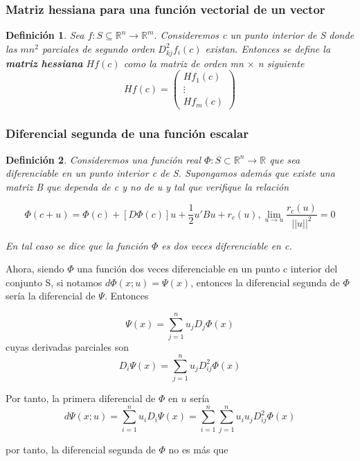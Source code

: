 \documentclass{article}
\theoremstyle{theorem-style}  %
\theoremstyle{definition-style}
\newtheorem{definition}{Definición}[section]
\theoremstyle{example-style}
\theoremstyle{exercise-style}
\begin{document}
	\subsubsection{Matriz hessiana para una función vectorial de un vector}
	
	\begin{definition}
		Sea $f: S \subseteq \mathbb{R}^n \rightarrow \mathbb{R}^m.$ Consideremos c un punto interior de S donde las $mn^2$ parciales de segundo orden $D^2_{kj}f_i(c)$ existan. Entonces se define la \textbf{matriz hessiana} $Hf(c)$ como la matriz de orden mn $\times$ n siguiente
		$$Hf(c) = \left( \begin{matrix}
		Hf_1(c) \\
		\vdots \\
		Hf_m(c) \end{matrix} \right)$$
	\end{definition}
	
	\subsubsection{Diferencial segunda de una función escalar}
	
	\begin{definition}
		Consideremos una función real $\Phi: S \subset \mathbb{R}^n \rightarrow \mathbb{R}$ que sea diferenciable en un punto interior c de S. Supongamos además que existe una matriz B que dependa de c y no de u y tal que verifique la relación
		
		$$\Phi(c + u) = \Phi(c) + [D \Phi(c)]u + \frac{1}{2} u' Bu + r_c(u), \lim_{u \rightarrow u} \frac{r_c(u)}{||u||^2} = 0$$
		
		En tal caso se dice que la función $\Phi$ es dos veces diferenciable en c.
	\end{definition}
	
	Ahora, siendo $\Phi$ una función dos veces diferenciable en un punto c interior del conjunto S, si notamos $d \Phi(x;u) = \Psi(x)$, entonces la diferencial segunda de $\Phi$ sería la diferencial de $\Psi$. Entonces 
	
	$$\Psi (x) = \sum_{j=1}^{n} u_j D_j \Phi(x)$$ cuyas derivadas parciales son $$D_i \Psi(x) = \sum_{j=1}^{n} u_j D_{ij}^2 \Phi(x)$$
	
	Por tanto, la primera diferencial de $\Phi$ en $u$ sería $$d \Psi (x;u) = \sum_{i = 1}^{n} u_i D_i \Psi(x) = \sum_{i = 1}^{n} \sum_{j=1}^{n} u_i u_j D_{ij}^2 \Phi(x)$$
	
	por tanto, la diferencial segunda de $\Phi$ no es más que
	
\end{document}
